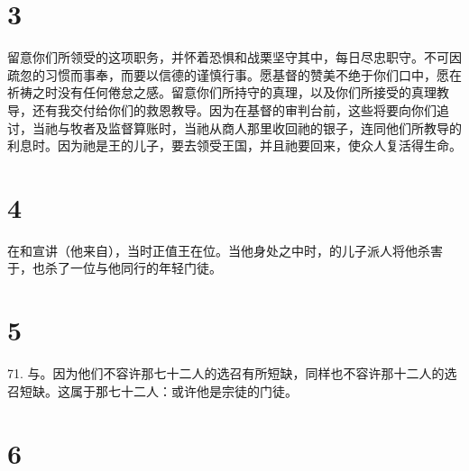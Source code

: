 \section{3}

\par

留意你们所领受的这项职务，并怀着恐惧和战栗坚守其中，每日尽忠职守。不可因疏忽的习惯而事奉，而要以信德的谨慎行事。愿基督的赞美不绝于你们口中，愿在祈祷之时没有任何倦怠之感。留意你们所持守的真理，以及你们所接受的真理教导，还有我交付给你们的救恩教导。因为在基督的审判台前，这些将要向你们追讨，当祂与牧者及监督算账时，当祂从商人那里收回祂的银子，连同他们所教导的利息时。因为祂是王的儿子，要去领受王国，并且祂要回来，使众人复活得生命。\par


\section{4}

在和宣讲（他来自），当时正值王在位。当他身处之中时，的儿子派人将他杀害于，也杀了一位与他同行的年轻门徒。\par


\section{5}

71. 与。因为他们不容许那七十二人的选召有所短缺，同样也不容许那十二人的选召短缺。这属于那七十二人：或许他是宗徒的门徒。\par


\section{6}

\par

